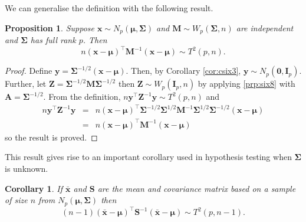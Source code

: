 \documentclass[]{book}
\newtheorem{corollary}{Corollary}[chapter]
\newtheorem{proposition}{Proposition}[chapter]
\theoremstyle{definition}
\theoremstyle{definition}
\theoremstyle{definition}
\theoremstyle{remark}
\begin{document}
We can generalise the definition with the following result.

\begin{proposition}
\protect\hypertarget{prp:six13}{}{\label{prp:six13} }Suppose \(\boldsymbol x\sim N_p(\boldsymbol \mu,\boldsymbol \Sigma)\) and \(\boldsymbol M\sim W_p(\boldsymbol \Sigma,n)\) are independent and
\(\boldsymbol \Sigma\) has full rank \(p\). Then
\[ n (\boldsymbol x-\boldsymbol \mu)^\top \boldsymbol M^{-1} (\boldsymbol x-\boldsymbol \mu) \sim T^2(p,n). \]
\end{proposition}

\begin{proof}
{}Define \(\boldsymbol y= \boldsymbol \Sigma^{-1/2}(\boldsymbol x-\boldsymbol \mu)\). Then, by Corollary \ref{cor:csix3}, \(\boldsymbol y\sim N_p(\boldsymbol 0,\boldsymbol I_p)\). Further, let \(\boldsymbol Z= \boldsymbol \Sigma^{-1/2} \boldsymbol M\boldsymbol \Sigma^{-1/2}\) then \(\boldsymbol Z\sim W_p(\boldsymbol I_p,n)\) by applying \ref{prp:six8} with \(\boldsymbol A= \boldsymbol \Sigma^{-1/2}\). From the definition, \(n \boldsymbol y^\top \boldsymbol Z^{-1} \boldsymbol y\sim T^2(p,n)\) and
\begin{eqnarray*}
n \boldsymbol y^\top \boldsymbol Z^{-1} \boldsymbol y&=& n (\boldsymbol x-\boldsymbol \mu)^\top \boldsymbol \Sigma^{-1/2} \boldsymbol \Sigma^{1/2} \boldsymbol M^{-1} \boldsymbol \Sigma^{1/2} \boldsymbol \Sigma^{-1/2} (\boldsymbol x-\boldsymbol \mu) \\
&=& n(\boldsymbol x-\boldsymbol \mu)^\top \boldsymbol M^{-1}(\boldsymbol x-\boldsymbol \mu)
\end{eqnarray*}
so the result is proved.
\end{proof}

This result gives rise to an important corollary used in hypothesis testing when \(\boldsymbol \Sigma\) is unknown.

\begin{corollary}
\protect\hypertarget{cor:csix5}{}{\label{cor:csix5} }If \(\bar{\boldsymbol x}\) and \(\boldsymbol S\) are the mean and covariance matrix based on a sample of size \(n\) from \(N_p(\boldsymbol \mu,\boldsymbol \Sigma)\) then
\[ (n-1)(\bar{\boldsymbol x}-\boldsymbol \mu)^\top \boldsymbol S^{-1} (\bar{\boldsymbol x}-\boldsymbol \mu) \sim T^2(p,n-1).\]
\end{corollary}
\end{document}
